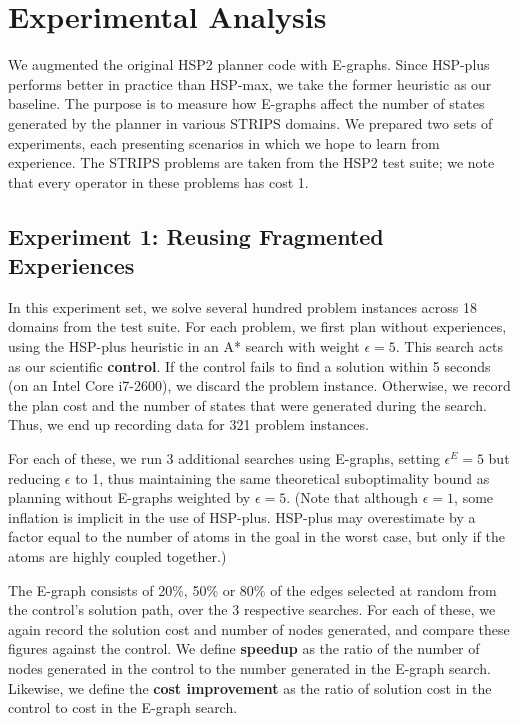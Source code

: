 \documentclass[letterpaper]{article}
\begin{document}
\section{Experimental Analysis}

We augmented the original HSP2 planner code \cite{bonet2001planning} with E-graphs.
Since HSP-plus performs better in practice than HSP-max, we take the former heuristic as our baseline.
The purpose is to measure how E-graphs affect the number of states generated by the planner in various STRIPS domains.
We prepared two sets of experiments, each presenting scenarios in which we hope to learn from experience.
The STRIPS problems are taken from the HSP2 test suite; we note that every operator in these problems has cost 1.

\subsection{Experiment 1: Reusing Fragmented Experiences}

In this experiment set, we solve several hundred problem instances across 18 domains from the test suite.
For each problem, we first plan without experiences, using the HSP-plus heuristic in an A* search with weight $\epsilon=5$.
This search acts as our scientific \textbf{control}.
If the control fails to find a solution within 5 seconds (on an Intel Core i7-2600), we discard the problem instance.
Otherwise, we record the plan cost and the number of states that were generated during the search.
Thus, we end up recording data for 321 problem instances.

For each of these, we run 3 additional searches using E-graphs, setting $\epsilon^E=5$ but reducing $\epsilon$ to 1, thus maintaining the same theoretical suboptimality bound as planning without E-graphs weighted by $\epsilon=5$.
(Note that although $\epsilon = 1$, some inflation is implicit in the use of HSP-plus.
HSP-plus may overestimate by a factor equal to the number of atoms in the goal in the worst case, but only if the atoms are highly coupled together.)

The E-graph consists of 20\%, 50\% or 80\% of the edges selected at random from the control's solution path, over the 3 respective searches. For each of these, we again record the solution cost and number of nodes generated, and compare these figures against the control.
We define \textbf{speedup} as the ratio of the number of nodes generated in the control to the number generated in the E-graph search.
Likewise, we define the \textbf{cost improvement} as the ratio of solution cost in the control to cost in the E-graph search.
\end{document}
